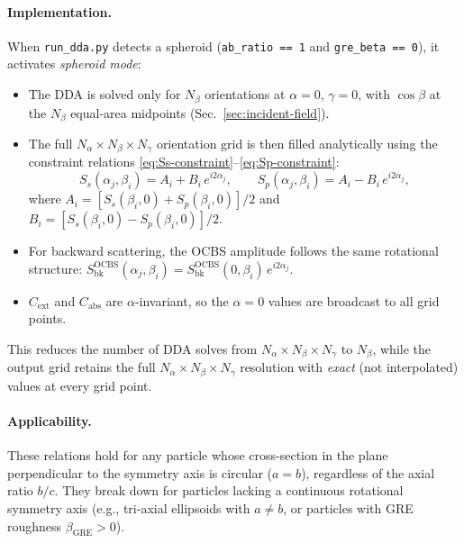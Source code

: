 \documentclass[11pt,a4paper]{article}
\begin{document}
\paragraph{Implementation.}
When \texttt{run\_dda.py} detects a spheroid
(\texttt{ab\_ratio == 1} and \texttt{gre\_beta == 0}),
it activates \emph{spheroid mode}:
\begin{itemize}
  \item The DDA is solved only for $N_\beta$ orientations at
        $\alpha = 0$, $\gamma = 0$, with $\cos\beta$ at the
        $N_\beta$ equal-area midpoints (Sec.~\ref{sec:incident-field}).
  \item The full $N_\alpha \times N_\beta \times N_\gamma$ orientation
        grid is then filled analytically using the constraint relations
        \eqref{eq:Ss-constraint}--\eqref{eq:Sp-constraint}:
        \[
          S_s(\alpha_j, \beta_i)
            = A_i + B_i\,e^{i2\alpha_j}, \qquad
          S_p(\alpha_j, \beta_i)
            = A_i - B_i\,e^{i2\alpha_j},
        \]
        where $A_i = [S_s(\beta_i,0) + S_p(\beta_i,0)]/2$ and
        $B_i = [S_s(\beta_i,0) - S_p(\beta_i,0)]/2$.
  \item For backward scattering, the OCBS amplitude follows the same
        rotational structure:
        $S_{\mathrm{bk}}^{\mathrm{OCBS}}(\alpha_j, \beta_i)
         = S_{\mathrm{bk}}^{\mathrm{OCBS}}(0, \beta_i)\,e^{i2\alpha_j}$.
  \item $C_{\mathrm{ext}}$ and $C_{\mathrm{abs}}$ are $\alpha$-invariant,
        so the $\alpha = 0$ values are broadcast to all grid points.
\end{itemize}
This reduces the number of DDA solves from
$N_\alpha \times N_\beta \times N_\gamma$ to $N_\beta$, while
the output grid retains the full
$N_\alpha \times N_\beta \times N_\gamma$ resolution with
\emph{exact} (not interpolated) values at every grid point.

\paragraph{Applicability.}
These relations hold for any particle whose cross-section in the plane
perpendicular to the symmetry axis is circular ($a = b$), regardless
of the axial ratio $b/c$.  They break down for particles lacking a
continuous rotational symmetry axis (e.g., tri-axial ellipsoids with
$a \neq b$, or particles with GRE roughness $\beta_{\mathrm{GRE}} > 0$).
\end{document}
